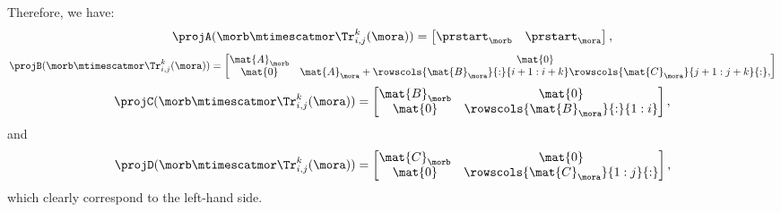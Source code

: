 \begin{example}
    Therefore, we have:
    \begin{equation*}
        \projA(\morb \mtimescatmor \Tr_{i,j}^k(\mora))=\begin{bmatrix}\prstart_\morb &\prstart_\mora\end{bmatrix},
    \end{equation*}
    \begin{equation*}
        \projB(\morb \mtimescatmor \Tr_{i,j}^k(\mora))=\begin{bmatrix}
            \mat{A}_\morb & \mat{0}                                                                                    \\
            \mat{0}       & \mat{A}_\mora + \rowscols{\mat{B}_\mora}{:}{i+1:i+k} \rowscols{\mat{C}_\mora}{j+1:j+k}{:},
        \end{bmatrix}
    \end{equation*}
    \begin{equation*}
        \projC(\morb \mtimescatmor \Tr_{i,j}^k(\mora))=\begin{bmatrix}
            \mat{B}_\morb & \mat{0}                          \\
            \mat{0}       & \rowscols{\mat{B}_\mora}{:}{1:i}
        \end{bmatrix},
    \end{equation*}
    and
    \begin{equation*}
        \projD(\morb \mtimescatmor \Tr_{i,j}^k(\mora))=
        \begin{bmatrix}
            \mat{C}_\morb & \mat{0}                          \\
            \mat{0}       & \rowscols{\mat{C}_\mora}{1:j}{:}
        \end{bmatrix},
    \end{equation*}
    which clearly correspond to the left-hand side.
\end{example}

